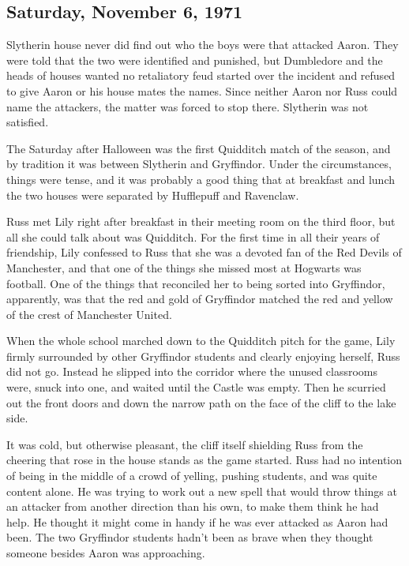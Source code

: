 \subsection{Saturday, November 6, 1971}

Slytherin house never did find out who the boys were that attacked Aaron. They were told that the two were identified and punished, but Dumbledore and the heads of houses wanted no retaliatory feud started over the incident and refused to give Aaron or his house mates the names. Since neither Aaron nor Russ could name the attackers, the matter was forced to stop there. Slytherin was not satisfied.

The Saturday after Halloween was the first Quidditch match of the season, and by tradition it was between Slytherin and Gryffindor. Under the circumstances, things were tense, and it was probably a good thing that at breakfast and lunch the two houses were separated by Hufflepuff and Ravenclaw.

Russ met Lily right after breakfast in their meeting room on the third floor, but all she could talk about was Quidditch. For the first time in all their years of friendship, Lily confessed to Russ that she was a devoted fan of the Red Devils of Manchester, and that one of the things she missed most at Hogwarts was football. One of the things that reconciled her to being sorted into Gryffindor, apparently, was that the red and gold of Gryffindor matched the red and yellow of the crest of Manchester United.

When the whole school marched down to the Quidditch pitch for the game, Lily firmly surrounded by other Gryffindor students and clearly enjoying herself, Russ did not go. Instead he slipped into the corridor where the unused classrooms were, snuck into one, and waited until the Castle was empty. Then he scurried out the front doors and down the narrow path on the face of the cliff to the lake side.

It was cold, but otherwise pleasant, the cliff itself shielding Russ from the cheering that rose in the house stands as the game started. Russ had no intention of being in the middle of a crowd of yelling, pushing students, and was quite content alone. He was trying to work out a new spell that would throw things at an attacker from another direction than his own, to make them think he had help. He thought it might come in handy if he was ever attacked as Aaron had been. The two Gryffindor students hadn't been as brave when they thought someone besides Aaron was approaching.

